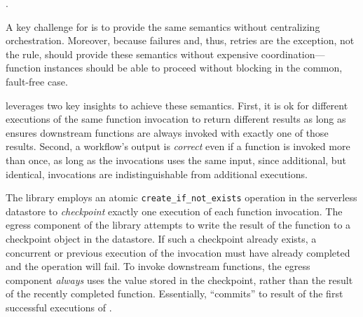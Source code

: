 .

A key challenge for \name{} is to provide the same semantics without
centralizing orchestration. Moreover, because failures and, thus, retries are
the exception, not the rule, \name{} should provide these semantics without
expensive coordination---function instances should be able to proceed without
blocking  in the common,
fault-free case.

\name{} leverages two key insights to achieve these semantics.  First, it is ok
for different executions of the same function invocation to return different
results as long as \name{} ensures downstream functions are always invoked
with exactly one of those results. Second, a workflow's output is
\emph{correct} even if a function is invoked more than once, as long as the
invocations uses the same input, since additional, but identical, invocations
are indistinguishable from additional executions.

The \name{} library employs an atomic \texttt{create\_if\_not\_exists} operation
in the serverless datastore to \emph{checkpoint} exactly one execution of each
function invocation. The egress component of the \name{} library attempts to
write the result of the function to a checkpoint object in the datastore. If
such a checkpoint already exists, a concurrent or previous execution of the
invocation must have already completed and the operation will fail. To invoke
downstream functions, the egress component \emph{always} uses the value stored
in the checkpoint, rather than the result of the recently completed function.
Essentially, \name{} ``commits'' to result of the first successful executions of
.


